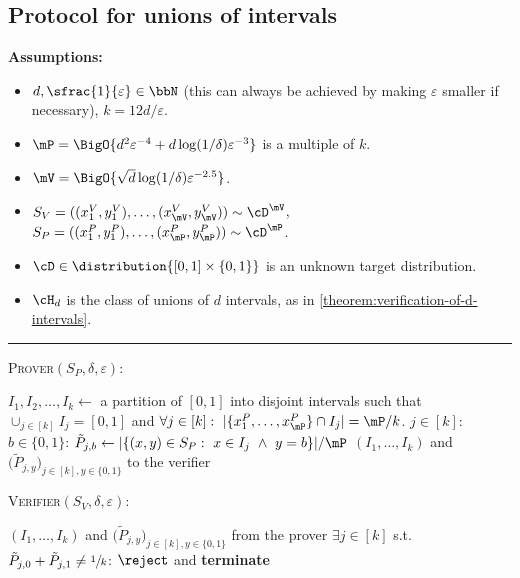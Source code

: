 \documentclass{toc}
\begin{document}
\begin{minipage}{\textwidth}
\subsection{Protocol for unions of intervals}\label{appendix:union-of-intervals}

\vspace{-0.25cm}
\begin{protocol}[H]
	\begin{ShadedAlgorithmBox}
		{\bfseries Assumptions:} 
		\begin{itemize}	
			\item{$d,\sfrac{1}{\varepsilon} \in \bbN$ (this can always be achieved by making $\varepsilon$ smaller if necessary), $k = 12d/\varepsilon$.}
				\item{$\mP = \BigO{d^2\varepsilon^{-4}	+ d\log(1/\delta)\varepsilon^{-3}}$ is a multiple of $k$.}
				\item{$\mV = \BigO{\sqrt{d}\log(1/\delta)\varepsilon^{-2.5}}$.}
			\item{
				$S_V = ((x_1^V,y_1^V),\dots,(x_{\mV}^V,y_{\mV}^V)) \sim \cD^{\mV}$, $S_P = ((x_1^P,y_1^P),\dots,(x_{\mP}^P,y_{\mP}^P)) \sim \cD^{\mP}$.
			}
			\item{
				$\cD \in \distribution{[0,1]\times \{0,1\}}$ is an unknown target distribution.
			}
			\item{
				$\cH_d$ is the class of unions of $d$ intervals, as in \cref{theorem:verification-of-d-intervals}.
			}
		\end{itemize}

		\noindent\rule{\textwidth}{0.5pt}

		\vsp

		\textsc{Prover}$(S_P,\delta,\varepsilon)$:
		\begin{algorithmic}
			\State $I_1,I_2,\dots,I_k \gets$ a partition of $[0,1]$ into disjoint intervals such that $\cup_{j \in [k]} I_j = [0,1]$
			\State \hfil and $\forall j \in [k]: ~ |\{x_1^P,\dots,x_{\mP}^P\}\cap I_j| = \mP/k$. \hfil
			\vsp
			\For $j \in [k]$:
				\For $b \in \{0,1\}$:
					\State $\tilde{P}_{j,b} \gets |\{(x,y) \in S_P: ~ x \in I_j ~ \land ~ y = b\}| / \mP$
				\EndFor
			\EndFor
			 $\left(I_1,\dots,I_k\right)$ and $\big(\tilde{P}_{j,y}\big)_{j \in [k], y \in \{0,1\}}$ to the verifier
		\end{algorithmic}

		\vsp

		\textsc{Verifier}$(S_V,\delta,\varepsilon)$:	
		\begin{algorithmic}
			 $\left(I_1,\dots,I_k\right)$ and $\big(\tilde{P}_{j,y}\big)_{j \in [k], y \in \{0,1\}}$ from the prover
			\vsp
			\If $\exists j \in [k]$ s.t. $\tilde{P}_{j,0} + \tilde{P}_{j,1} \neq \sfrac{1}{k}$:
				 $\reject$ and {\bfseries terminate} 
			\EndIf


\end{algorithmic}
\end{ShadedAlgorithmBox}
\end{protocol}
\end{minipage}
\end{document}
